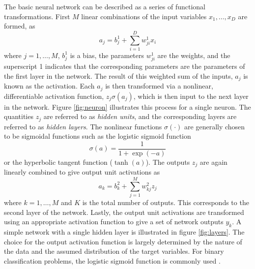 The basic neural network can be described as a series of functional transformations. First $M$ linear combinations of the input variables $x_1,\dots,x_D$ are formed, as
\begin{equation}
a_j = b_j^{1}+\sum_{i=1}^{D}w_{ji}^{1}x_i
\end{equation}
where $j=1,\dots,M$, $b_j^1$ is a bias, the parameters $w_{ji}^1$ are the weights, and the superscript 1 indicates that the corresponding parameters are the parameters of the first layer in the network. The result of this weighted sum of the inputs, $a_j$ is known as the activation. Each $a_j$ is then transformed via a nonlinear, differentiable activation function, $z_j\sigma(a_j)$, which is then input to the next layer in the network. Figure \ref{fig:neuron} illustrates this process for a single neuron. The quantities $z_j$ are referred to as \textit{hidden units}, and the corresponding layers are referred to as \textit{hidden layers}. The nonlinear functions $\sigma(\cdot)$ are generally chosen to be sigmoidal functions such as the logistic sigmoid function
\begin{equation}
\sigma(a)=\frac{1}{1+\exp(-a)}
\end{equation}
or the hyperbolic tangent function ($\tanh(a)$). The outputs $z_j$ are again linearly combined to give output unit activations as
\begin{equation}
a_k = b_k^2+\sum_{j=1}^{M}w_{kj}^2z_j
\end{equation} 
where $k=1,\dots,M$ and $K$ is the total number of outputs. This corresponds to the second layer of the network. Lastly, the output unit activations are transformed using an appropriate activation function to give a set of network outputs $y_k$. A simple network with a single hidden layer is illustrated in figure \ref{fig:layers}. The choice for the output activation function is largely determined by the nature of the data and the assumed distribution of the target variables. For binary classification problems, the logistic sigmoid function is commonly used \cite{machine_learning}.
